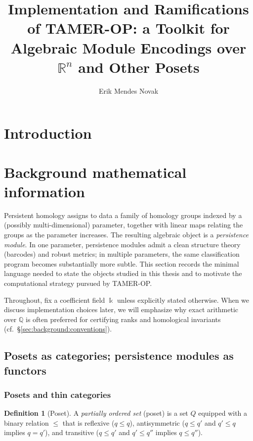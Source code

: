 \documentclass{article}
\title{Implementation and Ramifications of TAMER-OP: a Toolkit for Algebraic Module Encodings over $\mathbb{R}^n$ and Other Posets}
\author{Erik Mendes Novak}
\newcommand{\kk}{\Bbbk}
\newcommand{\<}{\langle}
\renewcommand{\>}{\rangle}
\newcommand{\bbb}[1]{\ensuremath{\mathbb{#1}}}
\theoremstyle{definition}
\newtheorem{defn}[theorem]{Definition}
\theoremstyle{remark}
\begin{document}
	\maketitle
	
	\tableofcontents
	
	
	\section{Introduction}
	
	
	\section{Background mathematical information}\label{sec:background}
	
	Persistent homology assigns to data a family of homology groups indexed by a
	(possibly multi-dimensional) parameter, together with linear maps relating the
	groups as the parameter increases.  The resulting algebraic object is a
	\emph{persistence module}.  In one parameter, persistence modules admit a clean
	structure theory (barcodes) and robust metrics; in multiple parameters, the same
	classification program becomes substantially more subtle.  This section records
	the minimal language needed to state the objects studied in this thesis and to
	motivate the computational strategy pursued by TAMER-OP.
	
	Throughout, fix a coefficient field $\kk$ unless explicitly stated otherwise.
	When we discuss implementation choices later, we will emphasize why exact
	arithmetic over $\bbb{Q}$ is often preferred for certifying ranks and homological
	invariants (cf.\ \S\ref{sec:background:conventions}).
	
	\subsection{Posets as categories; persistence modules as functors}
	\label{sec:background:posets-as-cats}
	
	\subsubsection*{Posets and thin categories}
	
	\begin{defn}[Poset]\label{def:poset}
		A \emph{partially ordered set} (poset) is a set $Q$ equipped with a binary relation
		$\leq$ that is reflexive ($q\leq q$), antisymmetric ($q\leq q'$ and $q'\leq q$
		implies $q=q'$), and transitive ($q\leq q'$ and $q'\leq q''$ implies $q\leq q''$).
	\end{defn}
	
\end{document}
